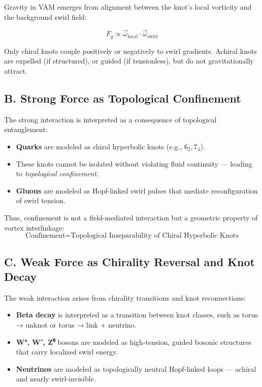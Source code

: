 \documentclass[12pt]{article}
\begin{document}
Gravity in VAM emerges from alignment between the knot’s local vorticity and the background swirl field:

\[
F_g \propto \vec{\omega}_{\text{local}} \cdot \vec{\omega}_{\text{swirl}}
\]

Only chiral knots couple positively or negatively to swirl gradients. Achiral knots are expelled (if structured), or guided (if tensionless), but do not gravitationally attract.

\subsection*{B. Strong Force as Topological Confinement}

The strong interaction is interpreted as a consequence of topological entanglement:

\begin{itemize}
    \item \textbf{Quarks} are modeled as chiral hyperbolic knots (e.g., \( 6_2, 7_4 \)).
    \item These knots cannot be isolated without violating fluid continuity — leading to \emph{topological confinement}.
    \item \textbf{Gluons} are modeled as Hopf-linked swirl pulses that mediate reconfiguration of swirl tension.
\end{itemize}

Thus, confinement is not a field-mediated interaction but a geometric property of vortex interlinkage:
\[
\text{Confinement} = \text{Topological Inseparability of Chiral Hyperbolic Knots}
\]

\subsection*{C. Weak Force as Chirality Reversal and Knot Decay}

The weak interaction arises from chirality transitions and knot reconnections:

\begin{itemize}
    \item \textbf{Beta decay} is interpreted as a transition between knot classes, such as torus → unknot or torus → link + neutrino.
    \item \textbf{W⁺, W⁻, Z⁰} bosons are modeled as high-tension, guided bosonic structures that carry localized swirl energy.
    \item \textbf{Neutrinos} are modeled as topologically neutral Hopf-linked loops — achiral and nearly swirl-invisible.
\end{itemize}
\end{document}
